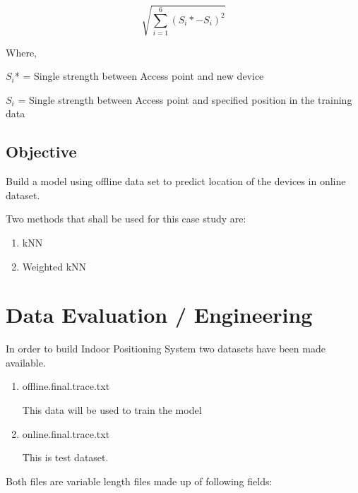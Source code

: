 \documentclass[
]{article}
\providecommand{\tightlist}{%
  \setlength{\itemsep}{0pt}\setlength{\parskip}{0pt}}
\begin{document}
\[\sqrt{\sum_{i=1}^6(S_i* - S_i)^2}\]

Where,

\(S_i\)* = Single strength between Access point and new device

\(S_i\) = Single strength between Access point and specified position in
the training data

\hypertarget{objective}{%
\subsection{Objective}\label{objective}}

Build a model using offline data set to predict location of the devices
in online dataset.

Two methods that shall be used for this case study are:

\begin{enumerate}
\def\labelenumi{\arabic{enumi}.}
\tightlist
\item
  kNN
\item
  Weighted kNN
\end{enumerate}

\newpage

\hypertarget{data-evaluation-engineering}{%
\section{Data Evaluation /
Engineering}\label{data-evaluation-engineering}}

In order to build Indoor Positioning System two datasets have been made
available.

\begin{enumerate}
\def\labelenumi{\arabic{enumi}.}
\item
  offline.final.trace.txt

  This data will be used to train the model
\item
  online.final.trace.txt

  This is test dataset.
\end{enumerate}

Both files are variable length files made up of following fields:
\end{document}
